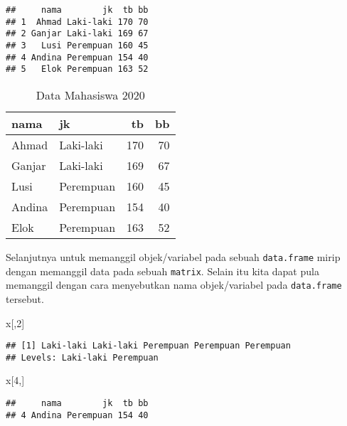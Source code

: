 \documentclass[
]{book}
\newenvironment{Shaded}{\begin{snugshade}}{\end{snugshade}}
\newcommand{\DecValTok}[1]{\textcolor[rgb]{0.00,0.00,0.81}{#1}}
\newcommand{\NormalTok}[1]{#1}
\newcommand{\SpecialCharTok}[1]{\textcolor[rgb]{0.00,0.00,0.00}{#1}}
\begin{document}
\begin{verbatim}
##     nama        jk  tb bb
## 1  Ahmad Laki-laki 170 70
## 2 Ganjar Laki-laki 169 67
## 3   Lusi Perempuan 160 45
## 4 Andina Perempuan 154 40
## 5   Elok Perempuan 163 52
\end{verbatim}

\begin{table}

\caption{\label{tab:unnamed-chunk-21}Data Mahasiswa 2020}
\centering
\begin{tabular}[t]{llrr}
\toprule
nama & jk & tb & bb\\
\midrule
Ahmad & Laki-laki & 170 & 70\\
Ganjar & Laki-laki & 169 & 67\\
Lusi & Perempuan & 160 & 45\\
Andina & Perempuan & 154 & 40\\
Elok & Perempuan & 163 & 52\\
\bottomrule
\end{tabular}
\end{table}

Selanjutnya untuk memanggil objek/variabel pada sebuah \texttt{data.frame} mirip dengan memanggil data pada sebuah \texttt{matrix}. Selain itu kita dapat pula memanggil dengan cara menyebutkan nama objek/variabel pada \texttt{data.frame} tersebut.

\begin{Shaded}
\begin{Highlighting}[]
\NormalTok{x[,}\DecValTok{2}\NormalTok{]}
\end{Highlighting}
\end{Shaded}

\begin{verbatim}
## [1] Laki-laki Laki-laki Perempuan Perempuan Perempuan
## Levels: Laki-laki Perempuan
\end{verbatim}

\begin{Shaded}
\begin{Highlighting}[]
\NormalTok{x[}\DecValTok{4}\NormalTok{,]}
\end{Highlighting}
\end{Shaded}

\begin{verbatim}
##     nama        jk  tb bb
## 4 Andina Perempuan 154 40
\end{verbatim}

\begin{Shaded}
\end{Shaded}
\end{document}
